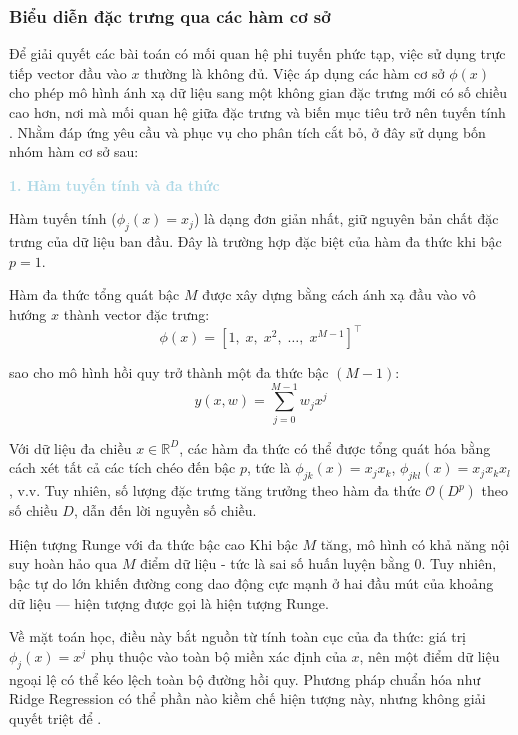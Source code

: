 \subsubsection{Biểu diễn đặc trưng qua các hàm cơ sở}

Để giải quyết các bài toán có mối quan hệ phi tuyến phức tạp, việc sử dụng trực tiếp vector đầu vào $x$ thường là không đủ. Việc áp dụng các hàm cơ sở $\phi(x)$ cho phép mô hình ánh xạ dữ liệu sang một không gian đặc trưng mới có số chiều cao hơn, nơi mà mối quan hệ giữa đặc trưng và biến mục tiêu trở nên tuyến tính \cite{bishop2006pattern}. Nhằm đáp ứng yêu cầu và phục vụ cho phân tích cắt bỏ, ở đây sử dụng bốn nhóm hàm cơ sở sau:

\noindent\textcolor{lightblue}{\textbf{1. Hàm tuyến tính và đa thức}}


\indent Hàm tuyến tính ($\phi_{j}(x)=x_{j}$) là dạng đơn giản nhất, giữ nguyên bản chất đặc trưng của dữ liệu ban đầu. Đây là trường hợp đặc biệt của hàm đa thức khi bậc $p=1$.


\indent Hàm đa thức tổng quát bậc $M$ được xây dựng bằng cách ánh xạ đầu vào vô hướng $x$ thành vector đặc trưng:
$$\phi(x) = [1,\; x,\; x^{2},\; \ldots,\; x^{M-1}]^{\top}$$

sao cho mô hình hồi quy trở thành một đa thức bậc $(M-1)$:
$$y(x, w) = \sum_{j=0}^{M-1} w_j x^j$$

Với dữ liệu đa chiều $x \in \mathbb{R}^D$, các hàm đa thức có thể được tổng quát hóa bằng cách xét tất cả các tích chéo đến bậc $p$, tức là $\phi_{jk}(x) = x_j x_k$, $\phi_{jkl}(x) = x_j x_k x_l$, v.v. Tuy nhiên, số lượng đặc trưng tăng trưởng theo hàm đa thức $\mathcal{O}(D^p)$ theo số chiều $D$, dẫn đến lời nguyền số chiều.

\begin{warningbox}{Hiện tượng Runge với đa thức bậc cao}
Khi bậc $M$ tăng, mô hình có khả năng nội suy hoàn hảo qua $M$ điểm dữ liệu - tức là sai số huấn luyện bằng 0. Tuy nhiên, bậc tự do lớn khiến đường cong dao động cực mạnh ở hai đầu mút của khoảng dữ liệu — hiện tượng được gọi là hiện tượng Runge. 

Về mặt toán học, điều này bắt nguồn từ tính toàn cục của đa thức: giá trị $\phi_j(x) = x^j$ phụ thuộc vào toàn bộ miền xác định của $x$, nên một điểm dữ liệu ngoại lệ có thể kéo lệch toàn bộ đường hồi quy. Phương pháp chuẩn hóa như Ridge Regression có thể phần nào kiềm chế hiện tượng này, nhưng không giải quyết triệt để \cite{bishop2006pattern}.
\end{warningbox}

